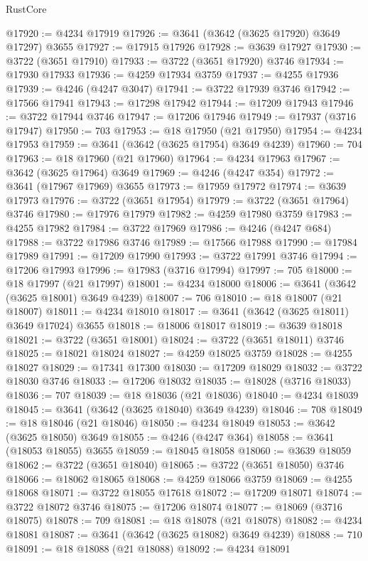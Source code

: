 \begin{lexlean}{RustCore}
\begin{coremodule}
@17920 := @4234 @17919
@17926 := @3641 (@3642 (@3625 @17920) @3649 @17297) @3655
@17927 := @17915 @17926
@17928 := @3639 @17927
@17930 := @3722 (@3651 @17910)
@17933 := @3722 (@3651 @17920) @3746
@17934 := @17930 @17933
@17936 := @4259 @17934 @3759
@17937 := @4255 @17936
@17939 := @4246 (@4247 @3047)
@17941 := @3722 @17939 @3746
@17942 := @17566 @17941
@17943 := @17298 @17942
@17944 := @17209 @17943
@17946 := @3722 @17944 @3746
@17947 := @17206 @17946
@17949 := @17937 (@3716 @17947)
@17950 := 703
@17953 := @18 @17950 (@21 @17950)
@17954 := @4234 @17953
@17959 := @3641 (@3642 (@3625 @17954) @3649 @4239)
@17960 := 704
@17963 := @18 @17960 (@21 @17960)
@17964 := @4234 @17963
@17967 := @3642 (@3625 @17964) @3649
@17969 := @4246 (@4247 @354)
@17972 := @3641 (@17967 @17969) @3655
@17973 := @17959 @17972
@17974 := @3639 @17973
@17976 := @3722 (@3651 @17954)
@17979 := @3722 (@3651 @17964) @3746
@17980 := @17976 @17979
@17982 := @4259 @17980 @3759
@17983 := @4255 @17982
@17984 := @3722 @17969
@17986 := @4246 (@4247 @684)
@17988 := @3722 @17986 @3746
@17989 := @17566 @17988
@17990 := @17984 @17989
@17991 := @17209 @17990
@17993 := @3722 @17991 @3746
@17994 := @17206 @17993
@17996 := @17983 (@3716 @17994)
@17997 := 705
@18000 := @18 @17997 (@21 @17997)
@18001 := @4234 @18000
@18006 := @3641 (@3642 (@3625 @18001) @3649 @4239)
@18007 := 706
@18010 := @18 @18007 (@21 @18007)
@18011 := @4234 @18010
@18017 := @3641 (@3642 (@3625 @18011) @3649 @17024) @3655
@18018 := @18006 @18017
@18019 := @3639 @18018
@18021 := @3722 (@3651 @18001)
@18024 := @3722 (@3651 @18011) @3746
@18025 := @18021 @18024
@18027 := @4259 @18025 @3759
@18028 := @4255 @18027
@18029 := @17341 @17300
@18030 := @17209 @18029
@18032 := @3722 @18030 @3746
@18033 := @17206 @18032
@18035 := @18028 (@3716 @18033)
@18036 := 707
@18039 := @18 @18036 (@21 @18036)
@18040 := @4234 @18039
@18045 := @3641 (@3642 (@3625 @18040) @3649 @4239)
@18046 := 708
@18049 := @18 @18046 (@21 @18046)
@18050 := @4234 @18049
@18053 := @3642 (@3625 @18050) @3649
@18055 := @4246 (@4247 @364)
@18058 := @3641 (@18053 @18055) @3655
@18059 := @18045 @18058
@18060 := @3639 @18059
@18062 := @3722 (@3651 @18040)
@18065 := @3722 (@3651 @18050) @3746
@18066 := @18062 @18065
@18068 := @4259 @18066 @3759
@18069 := @4255 @18068
@18071 := @3722 @18055 @17618
@18072 := @17209 @18071
@18074 := @3722 @18072 @3746
@18075 := @17206 @18074
@18077 := @18069 (@3716 @18075)
@18078 := 709
@18081 := @18 @18078 (@21 @18078)
@18082 := @4234 @18081
@18087 := @3641 (@3642 (@3625 @18082) @3649 @4239)
@18088 := 710
@18091 := @18 @18088 (@21 @18088)
@18092 := @4234 @18091

\end{coremodule}
\end{lexlean}
